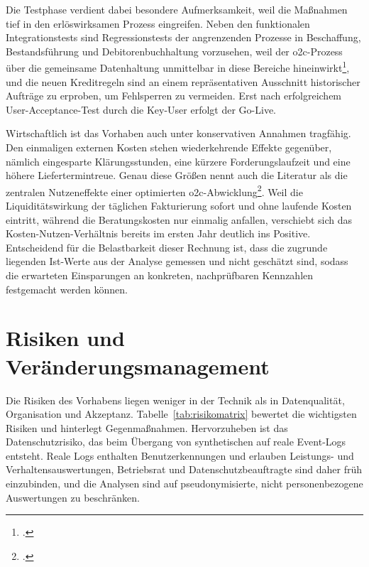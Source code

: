 Die Testphase verdient dabei besondere Aufmerksamkeit, weil die Maßnahmen tief in den erlöswirksamen Prozess eingreifen. Neben den funktionalen Integrationstests sind Regressionstests der angrenzenden Prozesse in Beschaffung, Bestandsführung und Debitorenbuchhaltung vorzusehen, weil der \gls{o2c}-Prozess über die gemeinsame Datenhaltung unmittelbar in diese Bereiche hineinwirkt\footcite[Vgl.][S.~63 ff.]{scheibler2021vertrieb}, und die neuen Kreditregeln sind an einem repräsentativen Ausschnitt historischer Aufträge zu erproben, um Fehlsperren zu vermeiden. Erst nach erfolgreichem User-Acceptance-Test durch die Key-User erfolgt der Go-Live.

Wirtschaftlich ist das Vorhaben auch unter konservativen Annahmen tragfähig. Den einmaligen externen Kosten stehen wiederkehrende Effekte gegenüber, nämlich eingesparte Klärungsstunden, eine kürzere Forderungslaufzeit und eine höhere Liefertermintreue. Genau diese Größen nennt auch die Literatur als die zentralen Nutzeneffekte einer optimierten \gls{o2c}-Abwicklung\footcite[Vgl.][S.~110 ff.]{nadukuru2024o2c}. Weil die Liquiditätswirkung der täglichen Fakturierung sofort und ohne laufende Kosten eintritt, während die Beratungskosten nur einmalig anfallen, verschiebt sich das Kosten-Nutzen-Verhältnis bereits im ersten Jahr deutlich ins Positive. Entscheidend für die Belastbarkeit dieser Rechnung ist, dass die zugrunde liegenden Ist-Werte aus der Analyse gemessen und nicht geschätzt sind, sodass die erwarteten Einsparungen an konkreten, nachprüfbaren Kennzahlen festgemacht werden können.

\section{Risiken und Veränderungsmanagement}\label{sec:risikobewertung}

Die Risiken des Vorhabens liegen weniger in der Technik als in Datenqualität, Organisation und Akzeptanz. Tabelle~\ref{tab:risikomatrix} bewertet die wichtigsten Risiken und hinterlegt Gegenmaßnahmen. Hervorzuheben ist das Datenschutzrisiko, das beim Übergang von synthetischen auf reale Event-Logs entsteht. Reale Logs enthalten Benutzerkennungen und erlauben Leistungs- und Verhaltensauswertungen, Betriebsrat und Datenschutzbeauftragte sind daher früh einzubinden, und die Analysen sind auf pseudonymisierte, nicht personenbezogene Auswertungen zu beschränken.

